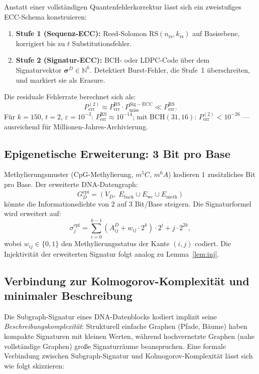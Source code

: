 ﻿\documentclass[a4paper,12pt]{article}
\theoremstyle{definition}
\theoremstyle{plain}
\begin{document}
Anstatt einer vollständigen Quantenfehlerkorrektur lässt sich ein
zweistufiges ECC-Schema konstruieren:
\begin{enumerate}
  \item \textbf{Stufe 1 (Sequenz-ECC):} Reed-Solomon
        $\mathrm{RS}(n_{\mathrm{rs}}, k_{\mathrm{rs}})$ auf Basisebene,
        korrigiert bis zu $t$ Substitutionsfehler.
  \item \textbf{Stufe 2 (Signatur-ECC):} BCH- oder LDPC-Code über dem
        Signaturvektor $\boldsymbol{\sigma}^D \in \mathbb{N}^k$.
        Detektiert Burst-Fehler, die Stufe~1 überschreiten, und markiert
        sie als Erasure.
\end{enumerate}
Die residuale Fehlerrate berechnet sich als:
\[
  P_{\mathrm{err}}^{(2)} \approx P_{\mathrm{err}}^{\mathrm{RS}} \cdot
  P_{\mathrm{miss}}^{\mathrm{Sig-ECC}} \ll P_{\mathrm{err}}^{\mathrm{RS}}.
\]
Für $k=150$, $t=2$, $\varepsilon = 10^{-3}$: $P_{\mathrm{err}}^{\mathrm{RS}}
\approx 10^{-14}$; mit BCH$(31,16)$: $P_{\mathrm{err}}^{(2)} < 10^{-26}$ ---
ausreichend für Millionen-Jahres-Archivierung.

\subsection{Epigenetische Erweiterung: 3 Bit pro Base}
\label{ssec:epigenetik}

Methylierungsmuster (CpG-Methylierung, $m^5C$, $m^6A$) kodieren
$1$ zusätzliches Bit pro Base.  Der erweiterte DNA-Datengraph:
\[
  G_D^{\mathrm{epi}} = (V_D,\;
  E_{\mathrm{back}} \cup E_{\mathrm{wc}} \cup E_{\mathrm{meth}})
\]
könnte die Informationsdichte von $2$ auf $3$ Bit/Base steigern.
Die Signaturformel wird erweitert auf:
\[
  \sigma_j^{\mathrm{epi}} = \sum_{i=0}^{k-1}
  (A^D_{ij} + w_{ij} \cdot 2^k) \cdot 2^i + j \cdot 2^{2k},
\]
wobei $w_{ij} \in \{0,1\}$ den Methylierungsstatus der Kante $(i,j)$ codiert.
Die Injektivität der erweiterten Signatur folgt analog zu Lemma~\ref{lem:inj}.

\subsection{Verbindung zur Kolmogorov-Komplexität und minimaler Beschreibung}
\label{ssec:kolmogorov}

Die Subgraph-Signatur eines DNA-Datenblocks kodiert implizit seine
\emph{Beschreibungskomplexität}: Strukturell einfache Graphen (Pfade,
Bäume) haben kompakte Signaturen mit kleinen Werten, während hochvernetzte
Graphen (nahe vollständige Graphen) große Signaturräume beanspruchen.
Eine formale Verbindung zwischen Subgraph-Signatur und Kolmogorov-Komplexität
lässt sich wie folgt skizzieren:
\end{document}
